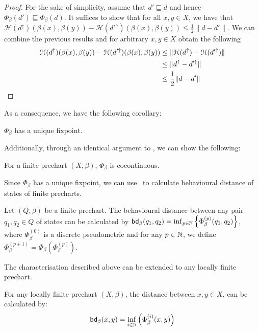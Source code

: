 \begin{proof}
	For the sake of simplicity, assume that $d' \sqsubseteq d$ and hence $\Phi_\beta(d') \sqsubseteq \Phi_{\beta}(d)$. It suffices to show that for all $x,y \in X$, we have that $\mathcal{H}(d^\uparrow)(\beta(x), \beta(y)) -  \mathcal{H}(d'^\uparrow)(\beta(x), \beta(y))  \leq \frac{1}{2}\|d-d'\|$. We can combine the previous results and for arbitrary $x,y \in X$ obtain the following
	\begin{align*}
		\mathcal{H}(d^\uparrow)(\beta(x), \beta(y)) -  \mathcal{H}(d'^\uparrow)(\beta(x), \beta(y)) & \leq \|\mathcal{H}(d^\uparrow) - \mathcal{H}(d'^\uparrow)\| \\
		&\leq \|d^\uparrow - d'^\uparrow\|\\
		& \leq \frac{1}{2} \|d - d'\| \qedhere
	\end{align*}
\end{proof}
As a consequence, we have the following corollary:
\begin{corollary}
	$\Phi_\beta$ has a unique fixpoint.
\end{corollary}
Additionally, through an identical argument to , we can show the following:
\begin{lemma}\label{lem:cocontinuous}
	For a finite prechart $(X,\beta)$, $\Phi_\beta$ is cocontinuous.
\end{lemma}
Since $\Phi_\beta$ has a unique fixpoint, we can use~ to calculate behavioural distance of states of finite precharts.
\begin{lemma}\label{lem:finite_dist}
	Let $(Q, \beta)$ be a finite prechart. The behavioural distance between any pair $q_1, q_2 \in Q$ of states can be calculated by $\mathsf{bd}_\beta(q_1,q_2) = \inf_{p \in \mathbb{N}} \left \{ \Phi^{(p)}_\beta(q_1, q_2) \right\}$, where $\Phi^{(0)}_\beta$ is a discrete pseudometric and for any $p \in \mathbb{N}$, we define $\Phi^{(p+1)}_\beta = \Phi_\beta \left( \Phi^{(p)}_\beta\right)$.
\end{lemma}
The characterisation described above can be extended to any locally finite prechart.
\begin{corollary}\label{cor:kleene_locally_finite}
	For any locally finite prechart $(X,\beta)$, the distance between $x, y \in X$, can be calculated by:
	\[
		\mathsf{bd}_\beta(x,y) = \inf_{i \in \mathbb{N}} \left(\Phi_\beta^{(i)}(x,y)\right)
	\]
\end{corollary}
